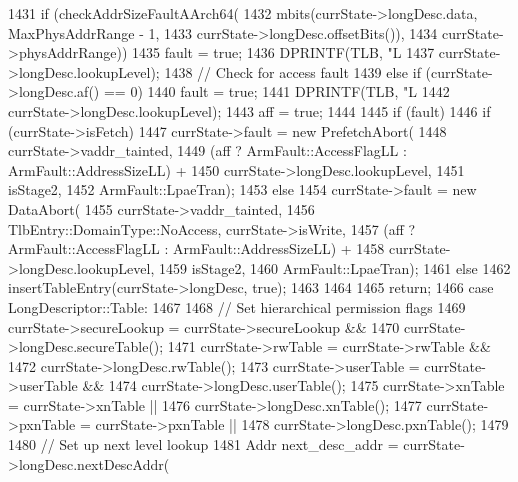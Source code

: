 \begin{DoxyCode}
{{{1431             if (checkAddrSizeFaultAArch64(
1432                     mbits(currState->longDesc.data, MaxPhysAddrRange - 1,
1433                           currState->longDesc.offsetBits()),
1434                     currState->physAddrRange)) {
1435                 fault = true;
1436                 DPRINTF(TLB, "L%
1437                         currState->longDesc.lookupLevel);
1438             // Check for access fault
1439             } else if (currState->longDesc.af() == 0) {
1440                 fault = true;
1441                 DPRINTF(TLB, "L%
1442                         currState->longDesc.lookupLevel);
1443                 aff = true;
1444             }
1445             if (fault) {
1446                 if (currState->isFetch)
1447                     currState->fault = new PrefetchAbort(
1448                         currState->vaddr_tainted,
1449                         (aff ? ArmFault::AccessFlagLL : ArmFault::AddressSizeLL) 
      +
1450                         currState->longDesc.lookupLevel,
1451                         isStage2,
1452                         ArmFault::LpaeTran);
1453                 else
1454                     currState->fault = new DataAbort(
1455                         currState->vaddr_tainted,
1456                         TlbEntry::DomainType::NoAccess, currState->isWrite,
1457                         (aff ? ArmFault::AccessFlagLL : ArmFault::AddressSizeLL) 
      +
1458                         currState->longDesc.lookupLevel,
1459                         isStage2,
1460                         ArmFault::LpaeTran);
1461             } else {
1462                 insertTableEntry(currState->longDesc, true);
1463             }
1464         }
1465         return;
1466       case LongDescriptor::Table:
1467         {
1468             // Set hierarchical permission flags
1469             currState->secureLookup = currState->secureLookup &&
1470                 currState->longDesc.secureTable();
1471             currState->rwTable = currState->rwTable &&
1472                 currState->longDesc.rwTable();
1473             currState->userTable = currState->userTable &&
1474                 currState->longDesc.userTable();
1475             currState->xnTable = currState->xnTable ||
1476                 currState->longDesc.xnTable();
1477             currState->pxnTable = currState->pxnTable ||
1478                 currState->longDesc.pxnTable();
1479 
1480             // Set up next level lookup
1481             Addr next_desc_addr = currState->longDesc.nextDescAddr(
}}}
\end{DoxyCode}
